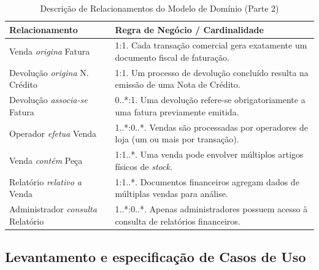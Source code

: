 \documentclass[a4paper,12pt]{scrreprt}
\begin{document}
    \begin{table}[H]
        \centering
        \renewcommand{\arraystretch}{1.5}
        \begin{tabular}{|p{}|p{}|}
            \hline
            \rowcolor{gray!20} \textbf{Relacionamento} & \textbf{Regra de Negócio / Cardinalidade} \\ \hline
            Venda \textit{origina} Fatura & 1:1. Cada transação comercial gera exatamente um documento fiscal de faturação. \\ \hline
            Devolução \textit{origina} N. Crédito & 1:1. Um processo de devolução concluído resulta na emissão de uma Nota de Crédito. \\ \hline
            Devolução \textit{associa-se} Fatura & 0..*:1. Uma devolução refere-se obrigatoriamente a uma fatura previamente emitida. \\ \hline
            Operador \textit{efetua} Venda & 1..*:0..*. Vendas são processadas por operadores de loja (um ou mais por transação). \\ \hline
            Venda \textit{contém} Peça & 1:1..*. Uma venda pode envolver múltiplos artigos físicos de \textit{stock}. \\ \hline
            Relatório \textit{relativo a} Venda & 1:1..*. Documentos financeiros agregam dados de múltiplas vendas para análise. \\ \hline
            Administrador \textit{consulta} Relatório & 1..*:0..*. Apenas administradores possuem acesso à consulta de relatórios financeiros. \\ \hline
        \end{tabular}
        \caption{Descrição de Relacionamentos do Modelo de Domínio (Parte 2)}
        \label{tab:rel_pt2}
    \end{table}

\pagebreak

\subsection{Levantamento e especificação de Casos de Uso}
\end{document}
